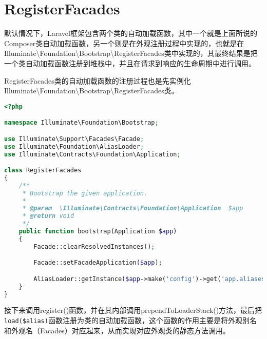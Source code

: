 \section{RegisterFacades}



默认情况下，Laravel框架包含两个类的自动加载函数，其中一个就是上面所说的Composer类自动加载函数，另一个则是在外观注册过程中实现的，也就是在Illuminate\textbackslash Foundation\textbackslash Bootstrap\textbackslash RegisterFacades类中实现的，其最终结果是把一个类自动加载函数注册到堆栈中，并且在请求到响应的生命周期中进行调用。

RegisterFacades类的自动加载函数的注册过程也是先实例化Illuminate\textbackslash Foundation\textbackslash Bootstrap\textbackslash RegisterFacades类。


\begin{lstlisting}[language=PHP]
<?php

namespace Illuminate\Foundation\Bootstrap;

use Illuminate\Support\Facades\Facade;
use Illuminate\Foundation\AliasLoader;
use Illuminate\Contracts\Foundation\Application;

class RegisterFacades
{
    /**
     * Bootstrap the given application.
     *
     * @param  \Illuminate\Contracts\Foundation\Application  $app
     * @return void
     */
    public function bootstrap(Application $app)
    {
        Facade::clearResolvedInstances();

        Facade::setFacadeApplication($app);

        AliasLoader::getInstance($app->make('config')->get('app.aliases'))->register();
    }
}
\end{lstlisting}

接下来调用register()函数，并在其内部调用prependToLoaderStack()方法，最后把\texttt{load(\$alias)}函数注册为类的自动加载函数，这个函数的作用主要是将外观别名和外观名（Facades）对应起来，从而实现对应外观类的静态方法调用。




